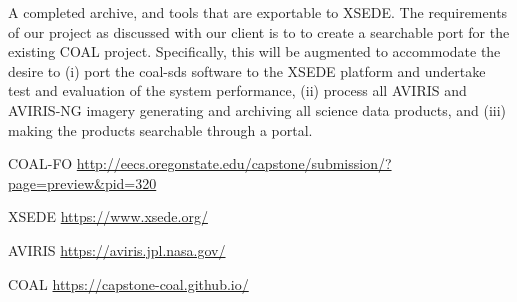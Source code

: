 \documentclass[a4paper,12pt]{article}
\begin{document}
\noindent A completed archive, and tools that are exportable to XSEDE. The requirements of our project as discussed with our client is to to create a searchable port for the existing COAL project. Specifically, this will be augmented to accommodate the desire to (i) port the coal-sds software to the XSEDE platform and undertake test and evaluation of the system performance, (ii) process all AVIRIS and AVIRIS-NG imagery generating and archiving all science data products, and (iii) making the products searchable through a portal.\newline

\newline

\noindent [1] COAL-FO \url{http://eecs.oregonstate.edu/capstone/submission/?page=preview\&pid=320} \newline

\noindent [2] XSEDE \url{https://www.xsede.org/} \newline

\noindent [3] AVIRIS \url{https://aviris.jpl.nasa.gov/} \newline

\noindent [4] COAL \url{https://capstone-coal.github.io/}
\end{document}
